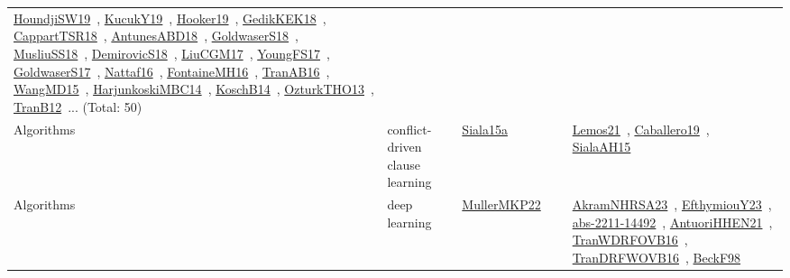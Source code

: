 {\begin{longtable}{lp{3cm}>{\raggedright\arraybackslash}p{6cm}>{\raggedright\arraybackslash}p{6cm}>{\raggedright\arraybackslash}p{8cm}}
\href{../works/HoundjiSW19.pdf}{HoundjiSW19}~\cite{HoundjiSW19}, \href{../works/KucukY19.pdf}{KucukY19}~\cite{KucukY19}, \href{../works/Hooker19.pdf}{Hooker19}~\cite{Hooker19}, \href{../works/GedikKEK18.pdf}{GedikKEK18}~\cite{GedikKEK18}, \href{../works/CappartTSR18.pdf}{CappartTSR18}~\cite{CappartTSR18}, \href{../works/AntunesABD18.pdf}{AntunesABD18}~\cite{AntunesABD18}, \href{../works/GoldwaserS18.pdf}{GoldwaserS18}~\cite{GoldwaserS18}, \href{../works/MusliuSS18.pdf}{MusliuSS18}~\cite{MusliuSS18}, \href{../works/DemirovicS18.pdf}{DemirovicS18}~\cite{DemirovicS18}, \href{../works/LiuCGM17.pdf}{LiuCGM17}~\cite{LiuCGM17}, \href{../works/YoungFS17.pdf}{YoungFS17}~\cite{YoungFS17}, \href{../works/GoldwaserS17.pdf}{GoldwaserS17}~\cite{GoldwaserS17}, \href{../works/Nattaf16.pdf}{Nattaf16}~\cite{Nattaf16}, \href{../works/FontaineMH16.pdf}{FontaineMH16}~\cite{FontaineMH16}, \href{../works/TranAB16.pdf}{TranAB16}~\cite{TranAB16}, \href{../works/WangMD15.pdf}{WangMD15}~\cite{WangMD15}, \href{../works/HarjunkoskiMBC14.pdf}{HarjunkoskiMBC14}~\cite{HarjunkoskiMBC14}, \href{../works/KoschB14.pdf}{KoschB14}~\cite{KoschB14}, \href{../works/OzturkTHO13.pdf}{OzturkTHO13}~\cite{OzturkTHO13}, \href{../works/TranB12.pdf}{TranB12}~\cite{TranB12}... (Total: 50)\\
Algorithms & conflict-driven clause learning & \href{../works/Siala15a.pdf}{Siala15a}~\cite{Siala15a} &  & \href{../works/Lemos21.pdf}{Lemos21}~\cite{Lemos21}, \href{../works/Caballero19.pdf}{Caballero19}~\cite{Caballero19}, \href{../works/SialaAH15.pdf}{SialaAH15}~\cite{SialaAH15}\\
Algorithms & deep learning & \href{../works/MullerMKP22.pdf}{MullerMKP22}~\cite{MullerMKP22} &  & \href{../works/AkramNHRSA23.pdf}{AkramNHRSA23}~\cite{AkramNHRSA23}, \href{../works/EfthymiouY23.pdf}{EfthymiouY23}~\cite{EfthymiouY23}, \href{../works/abs-2211-14492.pdf}{abs-2211-14492}~\cite{abs-2211-14492}, \href{../works/AntuoriHHEN21.pdf}{AntuoriHHEN21}~\cite{AntuoriHHEN21}, \href{../works/TranWDRFOVB16.pdf}{TranWDRFOVB16}~\cite{TranWDRFOVB16}, \href{../works/TranDRFWOVB16.pdf}{TranDRFWOVB16}~\cite{TranDRFWOVB16}, \href{../works/BeckF98.pdf}{BeckF98}~\cite{BeckF98}\\

\end{longtable}}
